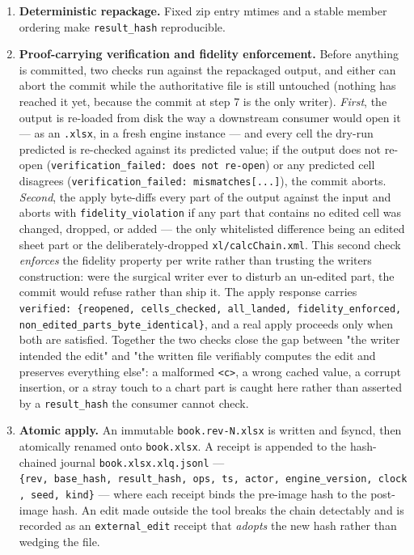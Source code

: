 \documentclass[
]{article}
\begin{document}
\begin{enumerate}
  and the shared-string or inline value), preserving every other element
  in that sheet --- merged cells, conditional formatting, column widths.
  \texttt{xl/calcChain.xml} is dropped if present. Every other part is
  copied byte-for-byte.
\item
  \textbf{Deterministic repackage.} Fixed zip entry mtimes and a stable
  member ordering make \texttt{result\_hash} reproducible.
\item
  \textbf{Proof-carrying verification and fidelity enforcement.} Before
  anything is committed, two checks run against the repackaged output,
  and either can abort the commit while the authoritative file is still
  untouched (nothing has reached it yet, because the commit at step 7 is
  the only writer). \emph{First}, the output is re-loaded from disk the
  way a downstream consumer would open it --- as an \texttt{.xlsx}, in a
  fresh engine instance --- and every cell the dry-run predicted is
  re-checked against its predicted value; if the output does not re-open
  (\texttt{verification\_failed:\ does\ not\ re-open}) or any predicted
  cell disagrees (\texttt{verification\_failed:\ mismatches{[}...{]}}),
  the commit aborts. \emph{Second}, the apply byte-diffs every part of
  the output against the input and aborts with
  \texttt{fidelity\_violation} if any part that contains no edited cell
  was changed, dropped, or added --- the only whitelisted difference
  being an edited sheet part or the deliberately-dropped
  \texttt{xl/calcChain.xml}. This second check \emph{enforces} the
  fidelity property per write rather than trusting the
  writer\textquotesingle s construction: were the surgical writer ever
  to disturb an un-edited part, the commit would refuse rather than ship
  it. The apply response carries
  \texttt{verified:\ \{reopened,\ cells\_checked,\ all\_landed,\ fidelity\_enforced,\ non\_edited\_parts\_byte\_identical\}},
  and a real apply proceeds only when both are satisfied. Together the
  two checks close the gap between "the writer intended the edit" and
  "the written file verifiably computes the edit and preserves
  everything else": a malformed \texttt{\textless{}c\textgreater{}}, a
  wrong cached value, a corrupt insertion, or a stray touch to a chart
  part is caught here rather than asserted by a \texttt{result\_hash}
  the consumer cannot check.
\item
  \textbf{Atomic apply.} An immutable \texttt{book.rev-N.xlsx} is
  written and fsync\textquotesingle d, then atomically renamed onto
  \texttt{book.xlsx}. A receipt is appended to the hash-chained journal
  \texttt{book.xlsx.xlq.jsonl} ---
  \texttt{\{rev,\ base\_hash,\ result\_hash,\ ops,\ ts,\ actor,\ engine\_version,\ clock,\ seed,\ kind\}}
  --- where each receipt binds the pre-image hash to the post-image
  hash. An edit made outside the tool breaks the chain detectably and is
  recorded as an \texttt{external\_edit} receipt that \emph{adopts} the
  new hash rather than wedging the file.
\end{enumerate}
\end{document}
